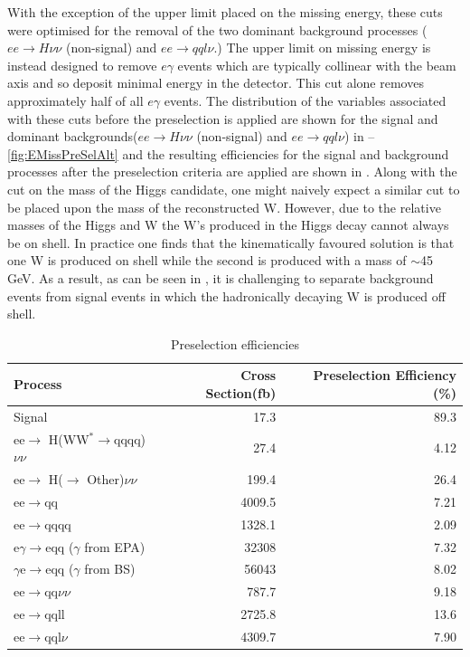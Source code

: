 With the exception of the upper limit placed on the missing energy, these cuts were optimised for the removal of the two dominant background processes ($ee\rightarrow H\nu\nu$ (non-signal) and $ee\rightarrow qql\nu$.) The upper limit on missing energy is instead designed to remove $e\gamma$ events which are typically collinear with the beam axis and so deposit minimal energy in the detector. This cut alone removes approximately half of all $e\gamma$ events. The distribution of the variables associated with these cuts before the preselection is applied are shown for the signal and dominant backgrounds($ee\rightarrow H\nu\nu$ (non-signal) and $ee\rightarrow qql\nu$) in --\ref{fig:EMissPreSelAlt} and the resulting efficiencies for the signal and background processes after the preselection criteria are applied are shown in . Along with the cut on the mass of the Higgs candidate, one might naively expect a similar cut to be placed upon the mass of the reconstructed W. However, due to the relative masses of the Higgs and W the W's produced in the Higgs decay cannot always be on shell. In practice one finds that the kinematically favoured solution is that one W is produced on shell while the second is produced with a mass of $\sim$45 GeV. As a result, as can be seen in , it is challenging to separate background events from signal events in which the hadronically decaying W is produced off shell.

\begin{table}
  \centering
  \begin{tabular}{l r r }
   \toprule
    Process & Cross Section(fb) & Preselection Efficiency (\%)     \\
    \midrule
    Signal             & 17.3    &   89.3 \\ 
    \midrule
    ee$\rightarrow$ H(WW$^*\rightarrow$qqqq)$\nu\nu$  & 27.4    &  4.12  \\
    \midrule
    ee$\rightarrow$ H($\rightarrow$ Other)$\nu\nu$ & 199.4 & 26.4  \\
    \midrule
    ee$\rightarrow$qq               & 4009.5    &  7.21 \\ 
    \midrule
    ee$\rightarrow$qqqq               & 1328.1    &  2.09  \\ 
    \midrule
    e$\gamma$$\rightarrow$eqq ($\gamma$ from EPA)                 & 32308    & 7.32   \\ 
    \midrule
    $\gamma$e$\rightarrow$eqq ($\gamma$ from BS)               &  56043   &  8.02 \\ 
    \midrule
    ee$\rightarrow$qq$\nu\nu$               & 787.7    & 9.18  \\ 
    \midrule
    ee$\rightarrow$qqll               & 2725.8    &   13.6 \\ 
    \midrule
    ee$\rightarrow$qql$\nu$              & 4309.7    &  7.90  \\ 
    \bottomrule
  \end{tabular}
  \caption[Preselection efficiencies]{Preselection efficiencies}
  \label{fig:preseleff}
\end{table}



